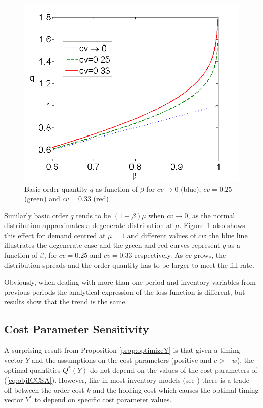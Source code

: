 {\begin{figure}[!ht]
\centering
\includegraphics[scale=0.50]{iccsa2015/figures/qnbeta.png}
\caption{Basic order quantity $q$ as function of $\beta$ for $cv \rightarrow 0$ (blue), $cv=0.25$ (green) and $cv=0.33$ (red)}
\label{fig:qnbeta}
\end{figure}

Similarly basic order ${q}$ tends to be $(1-\beta)\mu$  when $cv \rightarrow 0$, as the normal distribution approximates a degenerate distribution at $\mu$. Figure~\ref{fig:qnbeta} also shows this effect for demand centred at $\mu=1$ and different values of $cv$: the blue line illustrates the degenerate case and the green and red curves represent $q$ as a function of $\beta$, for $cv=0.25$ and $cv=0.33$ respectively. As $cv$ grows, the distribution spreads and the order quantity has to be larger to meet the fill rate.


Obviously, when dealing with more than one period and inventory variables from previous periods the analytical expression of the loss function is different, but results show that the trend is the same.

\subsection{Cost Parameter Sensitivity}

A surprising result from Proposition \ref{prop:optimizeY} is that given a timing vector $Y$ and the assumptions on the cost parameters (positive and $c>-w$),  the optimal quantities $Q^*(Y)$ do not depend on the values of the cost parameters of (\ref{eq:objICCSA}). However, like in most inventory models (see \cite{Silver98}) there is a trade off between the order cost $k$ and the holding cost which causes the optimal timing vector $Y^*$ to depend  on specific cost parameter values.


}
